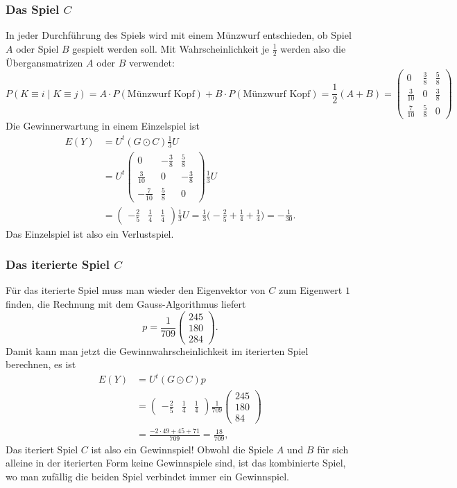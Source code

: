 \subsubsection{Das Spiel $C$}
In jeder Durchführung des Spiels wird mit einem Münzwurf entschieden,
ob Spiel $A$ oder Spiel $B$ gespielt werden soll.
Mit Wahrscheinlichkeit je $\frac12$ werden also die Übergansmatrizen
$A$ oder $B$ verwendet:
\[
P(K\equiv i\mid K\equiv j)
=
A\cdot P(\text{Münzwurf Kopf})
+
B\cdot P(\text{Münzwurf Kopf})
=
\frac12(A+B)
=
\begin{pmatrix}
0            & \frac{3}{8} & \frac{5}{8} \\
\frac{3}{10} & 0           & \frac{3}{8} \\
\frac{7}{10} & \frac{5}{8} & 0
\end{pmatrix}
\]
Die Gewinnerwartung in einem Einzelspiel ist
\begin{align*}
E(Y)
&=
U^t
(G\odot C)
\frac13U
\\
&=
U^t
\begin{pmatrix}
 0            &-\frac{3}{8} & \frac{5}{8} \\
 \frac{3}{10} & 0           &-\frac{3}{8} \\
-\frac{7}{10} & \frac{5}{8} & 0
\end{pmatrix}
\frac13U
\\
&=
\begin{pmatrix}
-\frac{2}{5} & \frac{1}{4} & \frac{1}{4}
\end{pmatrix}
\frac13U
=
\frac13\biggl(-\frac{2}{5}+\frac{1}{4}+\frac{1}{4}\biggr)
=
-\frac{1}{30}.
\end{align*}
Das Einzelspiel ist also ein Verlustspiel.

\subsubsection{Das iterierte Spiel $C$}
Für das iterierte Spiel muss man wieder den Eigenvektor von $C$ zum
Eigenwert $1$ finden, die Rechnung mit dem Gauss-Algorithmus liefert
\[
p=
\frac{1}{709}
\begin{pmatrix}
245\\180\\284
\end{pmatrix}.
\]
Damit kann man jetzt die Gewinnwahrscheinlichkeit im iterierten Spiel
berechnen, es ist
\begin{align*}
E(Y)
&=
U^t
(G\odot C) p
\\
&=
\begin{pmatrix}
-\frac{2}{5} & \frac{1}{4} & \frac{1}{4}
\end{pmatrix}
\frac{1}{709}
\begin{pmatrix}
245\\180\\84
\end{pmatrix}
\\
&=
\frac{
-2\cdot 49 + 45 + 71
}{709}
=
\frac{18}{709},
\end{align*}
Das iteriert Spiel $C$ ist also ein Gewinnspiel!
Obwohl die Spiele $A$ und $B$ für sich alleine in der iterierten Form
keine Gewinnspiele sind, ist das kombinierte Spiel, wo man zufällig
die beiden Spiel verbindet immer ein Gewinnspiel.


